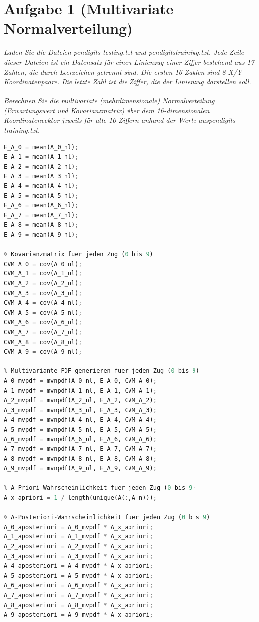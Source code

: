 \documentclass[12pt]{article}
\begin{document}
\section{Aufgabe 1 (Multivariate Normalverteilung)}
\textit{Laden Sie die Dateien pendigits-­testing.txt​ und pendigits­training.txt​. Jede Zeile dieser Dateien ist ein Datensatz für einen Linienzug einer Ziffer bestehend aus 17 Zahlen, die durch Leerzeichen getrennt sind. Die ersten 16 Zahlen sind 8 
X/Y­Koordinatenpaare. Die letzte Zahl ist die Ziffer, die der Linienzug darstellen soll.\\
\\
Berechnen Sie die multivariate (mehrdimensionale) Normalverteilung​ (Erwartungswert und Kovarianzmatrix) über dem 16­-dimensionalen Koordinatenvektor jeweils für alle 10 Ziffern anhand der Werte aus ​pendigits­training.txt​.}
\\
\begin{lstlisting}[language=Python]
% Erwartungswert fuer jede Koordinate fuer jeden Zug (0 bis 9)
E_A_0 = mean(A_0_nl);
E_A_1 = mean(A_1_nl);
E_A_2 = mean(A_2_nl);
E_A_3 = mean(A_3_nl);
E_A_4 = mean(A_4_nl);
E_A_5 = mean(A_5_nl);
E_A_6 = mean(A_6_nl);
E_A_7 = mean(A_7_nl);
E_A_8 = mean(A_8_nl);
E_A_9 = mean(A_9_nl);

% Kovarianzmatrix fuer jeden Zug (0 bis 9)
CVM_A_0 = cov(A_0_nl);
CVM_A_1 = cov(A_1_nl);
CVM_A_2 = cov(A_2_nl);
CVM_A_3 = cov(A_3_nl);
CVM_A_4 = cov(A_4_nl);
CVM_A_5 = cov(A_5_nl);
CVM_A_6 = cov(A_6_nl);
CVM_A_7 = cov(A_7_nl);
CVM_A_8 = cov(A_8_nl);
CVM_A_9 = cov(A_9_nl);

% Multivariante PDF generieren fuer jeden Zug (0 bis 9)
A_0_mvpdf = mvnpdf(A_0_nl, E_A_0, CVM_A_0);
A_1_mvpdf = mvnpdf(A_1_nl, E_A_1, CVM_A_1);
A_2_mvpdf = mvnpdf(A_2_nl, E_A_2, CVM_A_2);
A_3_mvpdf = mvnpdf(A_3_nl, E_A_3, CVM_A_3);
A_4_mvpdf = mvnpdf(A_4_nl, E_A_4, CVM_A_4);
A_5_mvpdf = mvnpdf(A_5_nl, E_A_5, CVM_A_5);
A_6_mvpdf = mvnpdf(A_6_nl, E_A_6, CVM_A_6);
A_7_mvpdf = mvnpdf(A_7_nl, E_A_7, CVM_A_7);
A_8_mvpdf = mvnpdf(A_8_nl, E_A_8, CVM_A_8);
A_9_mvpdf = mvnpdf(A_9_nl, E_A_9, CVM_A_9);

% A-Priori-Wahrscheinlichkeit fuer jeden Zug (0 bis 9)
A_x_apriori = 1 / length(unique(A(:,A_n)));

% A-Posteriori-Wahrscheinlichkeit fuer jeden Zug (0 bis 9)
A_0_aposteriori = A_0_mvpdf * A_x_apriori;
A_1_aposteriori = A_1_mvpdf * A_x_apriori;
A_2_aposteriori = A_2_mvpdf * A_x_apriori;
A_3_aposteriori = A_3_mvpdf * A_x_apriori;
A_4_aposteriori = A_4_mvpdf * A_x_apriori;
A_5_aposteriori = A_5_mvpdf * A_x_apriori;
A_6_aposteriori = A_6_mvpdf * A_x_apriori;
A_7_aposteriori = A_7_mvpdf * A_x_apriori;
A_8_aposteriori = A_8_mvpdf * A_x_apriori;
A_9_aposteriori = A_9_mvpdf * A_x_apriori;
\end{lstlisting}
\end{document}
